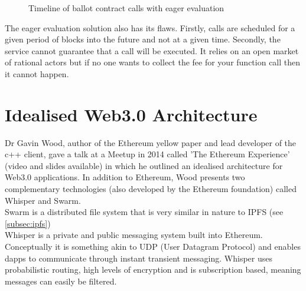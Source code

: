 \begin{figure}
\centering
{}
\decoRule
\caption[Eager Contract Scheduling]{Timeline of ballot contract calls with eager evaluation}
\label{fig:eager}
\end{figure}
The eager evaluation solution also has its flaws. Firstly, calls are scheduled for a given period of blocks into the future and not at a given time. Secondly, the service cannot guarantee that a call will be executed. It relies on an open market of rational actors but if no one wants to collect the fee for your function call then it cannot happen.\\

\section{Idealised Web3.0 Architecture}
\label{sec:web3Arch}
Dr Gavin Wood, author of the Ethereum yellow paper\cite{Yellowpaper} and lead developer of the c++ client, gave a talk at a Meetup in 2014 called 'The Ethereum Experience' (video\cite{Web3Vid} and slides\cite{Web3Slides} available) in which he outlined an idealised architecture for Web3.0 applications. In addition to Ethereum, Wood presents two complementary technologies (also developed by the Ethereum foundation) called Whisper and Swarm.\\ 

Swarm is a distributed file system that is very similar in nature to IPFS (see \ref{subsec:ipfs})\\

Whisper is a private and public messaging system built into Ethereum. Conceptually it is something akin to UDP (User Datagram Protocol) and enables dapps to communicate through instant transient messaging. Whisper uses probabilistic routing, high levels of encryption and is subscription based, meaning messages can easily be filtered.\\

